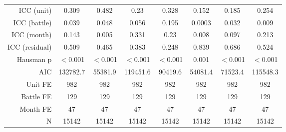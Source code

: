\begin{table}[ht]
\begin{tabular}{rccccccc}
  ICC (unit) & 0.309 & 0.482 & 0.23 & 0.328 & 0.152 & 0.185 & 0.254 \\ 
  ICC (battle) & 0.039 & 0.048 & 0.056 & 0.195 & 0.0003 & 0.032 & 0.009 \\ 
  ICC (month) & 0.143 & 0.005 & 0.331 & 0.23 & 0.008 & 0.097 & 0.213 \\ 
  ICC (residual) & 0.509 & 0.465 & 0.383 & 0.248 & 0.839 & 0.686 & 0.524 \\ 
  Hausman p & $<$0.001 & $<$0.001 & $<$0.001 & $<$0.001 & 0.001 & $<$0.001 & $<$0.001 \\ 
  AIC & 132782.7 & 55381.9 & 119451.6 & 90419.6 & 54081.4 & 71523.4 & 115548.3 \\ 
  Unit FE & 982 & 982 & 982 & 982 & 982 & 982 & 982 \\ 
  Battle FE & 129 & 129 & 129 & 129 & 129 & 129 & 129 \\ 
  Month FE & 47 & 47 & 47 & 47 & 47 & 47 & 47 \\ 
  N & 15142 & 15142 & 15142 & 15142 & 15142 & 15142 & 15142 \\ 
  \end{tabular}
\endgroup
\end{table}
